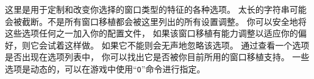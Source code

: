 \documentclass[a4paper, 10pt]{article}
\begin{document}
这里是用于定制和改变你选择的窗口类型的特征的各种选项。
太长的字符串可能会被截断。不是所有窗口移植都会被这里列出的所有设置调整。
你可以安全地将这些选项任何之一加入你的配置文件，
如果该窗口移植有能力调整以适应你的偏好，则它会试着这样做。
如果它不能则会无声地忽略该选项。
通过查看一个选项是否出现在选项列表中，
你可以找出它是否被你目前所用的窗口移植支持。
一些选项是动态的，可以在游戏中使用“{\tt O}”命令进行指定。
\end{document}
